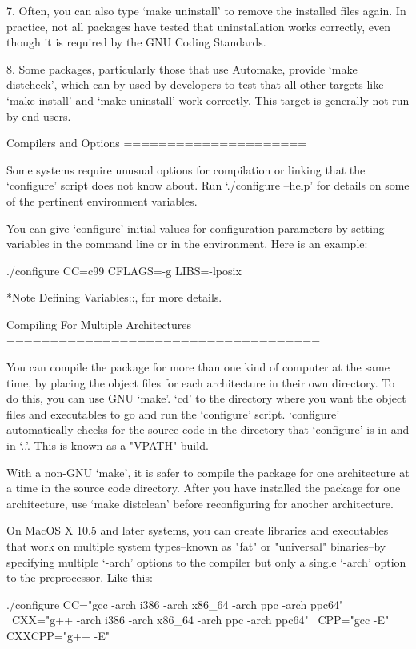 \begin{DoxyCodeInclude}
  7. Often, you can also type `make uninstall' to remove the installed
     files again.  In practice, not all packages have tested that
     uninstallation works correctly, even though it is required by the
     GNU Coding Standards.

  8. Some packages, particularly those that use Automake, provide `make
     distcheck', which can by used by developers to test that all other
     targets like `make install' and `make uninstall' work correctly.
     This target is generally not run by end users.

Compilers and Options
=====================

   Some systems require unusual options for compilation or linking that
the `configure' script does not know about.  Run `./configure --help'
for details on some of the pertinent environment variables.

   You can give `configure' initial values for configuration parameters
by setting variables in the command line or in the environment.  Here
is an example:

     ./configure CC=c99 CFLAGS=-g LIBS=-lposix

   *Note Defining Variables::, for more details.

Compiling For Multiple Architectures
====================================

   You can compile the package for more than one kind of computer at the
same time, by placing the object files for each architecture in their
own directory.  To do this, you can use GNU `make'.  `cd' to the
directory where you want the object files and executables to go and run
the `configure' script.  `configure' automatically checks for the
source code in the directory that `configure' is in and in `..'.  This
is known as a "VPATH" build.

   With a non-GNU `make', it is safer to compile the package for one
architecture at a time in the source code directory.  After you have
installed the package for one architecture, use `make distclean' before
reconfiguring for another architecture.

   On MacOS X 10.5 and later systems, you can create libraries and
executables that work on multiple system types--known as "fat" or
"universal" binaries--by specifying multiple `-arch' options to the
compiler but only a single `-arch' option to the preprocessor.  Like
this:

     ./configure CC="gcc -arch i386 -arch x86_64 -arch ppc -arch ppc64" \
                 CXX="g++ -arch i386 -arch x86_64 -arch ppc -arch ppc64" \
                 CPP="gcc -E" CXXCPP="g++ -E"


\end{DoxyCodeInclude}
